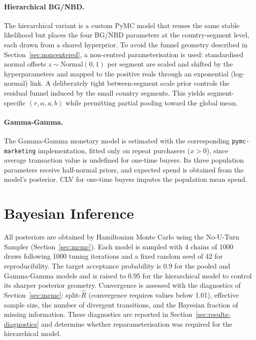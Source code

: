 \paragraph{Hierarchical BG/NBD.}
The hierarchical variant is a custom PyMC model that reuses the same stable likelihood but places the four BG/NBD parameters at the country-segment level, each drawn from a shared hyperprior. To avoid the funnel geometry described in Section~\ref{sec:noncentered}, a non-centred parameterisation is used: standardised normal offsets $z \sim \text{Normal}(0,1)$ per segment are scaled and shifted by the hyperparameters and mapped to the positive reals through an exponential (log-normal) link. A deliberately tight between-segment scale prior controls the residual funnel induced by the small country segments. This yields segment-specific $(r, \alpha, a, b)$ while permitting partial pooling toward the global mean.

\paragraph{Gamma-Gamma.}
The Gamma-Gamma monetary model \parencite{fader2013} is estimated with the corresponding \texttt{pymc-marketing} implementation, fitted only on repeat purchasers ($x > 0$), since average transaction value is undefined for one-time buyers. Its three population parameters receive half-normal priors, and expected spend is obtained from the model's posterior. CLV for one-time buyers imputes the population mean spend.

\section{Bayesian Inference}
\label{sec:inference}

All posteriors are obtained by Hamiltonian Monte Carlo using the No-U-Turn Sampler (Section~\ref{sec:mcmc}). Each model is sampled with \num{4} chains of \num{1000} draws following \num{1000} tuning iterations and a fixed random seed of \num{42} for reproducibility. The target acceptance probability is \num{0.9} for the pooled and Gamma-Gamma models and is raised to \num{0.95} for the hierarchical model to control its sharper posterior geometry. Convergence is assessed with the diagnostics of Section~\ref{sec:mcmc}: split-$\widehat{R}$ (convergence requires values below \num{1.01}), effective sample size, the number of divergent transitions, and the Bayesian fraction of missing information. These diagnostics are reported in Section~\ref{sec:results-diagnostics} and determine whether reparameterisation was required for the hierarchical model.

